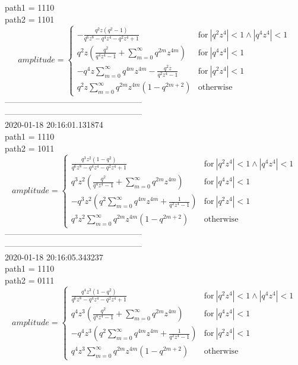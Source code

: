 path1 = 1110\\
path2 = 1101\\
$$amplitude = \begin{cases} - \frac{q^{2} z \left(q^{2} - 1\right)}{q^{6} z^{8} - q^{4} z^{4} - q^{2} z^{4} + 1} & \text{for}\: \left|{q^{2} z^{4}}\right| < 1 \wedge \left|{q^{4} z^{4}}\right| < 1 \\q^{2} z \left(\frac{q^{2}}{q^{4} z^{4} - 1} + \sum_{m=0}^{\infty} q^{2 m} z^{4 m}\right) & \text{for}\: \left|{q^{4} z^{4}}\right| < 1 \\- q^{4} z \sum_{m=0}^{\infty} q^{4 m} z^{4 m} - \frac{q^{2} z}{q^{2} z^{4} - 1} & \text{for}\: \left|{q^{2} z^{4}}\right| < 1 \\q^{2} z \sum_{m=0}^{\infty} q^{2 m} z^{4 m} \left(1 - q^{2 m + 2}\right) & \text{otherwise} \end{cases}$$
--------------------------------------------------\\
--------------------------------------------------\\
2020-01-18 20:16:01.131874\\
path1 = 1110\\
path2 = 1011\\
$$amplitude = \begin{cases} \frac{q^{3} z^{2} \left(1 - q^{2}\right)}{q^{6} z^{8} - q^{4} z^{4} - q^{2} z^{4} + 1} & \text{for}\: \left|{q^{2} z^{4}}\right| < 1 \wedge \left|{q^{4} z^{4}}\right| < 1 \\q^{3} z^{2} \left(\frac{q^{2}}{q^{4} z^{4} - 1} + \sum_{m=0}^{\infty} q^{2 m} z^{4 m}\right) & \text{for}\: \left|{q^{4} z^{4}}\right| < 1 \\- q^{3} z^{2} \left(q^{2} \sum_{m=0}^{\infty} q^{4 m} z^{4 m} + \frac{1}{q^{2} z^{4} - 1}\right) & \text{for}\: \left|{q^{2} z^{4}}\right| < 1 \\q^{3} z^{2} \sum_{m=0}^{\infty} q^{2 m} z^{4 m} \left(1 - q^{2 m + 2}\right) & \text{otherwise} \end{cases}$$
--------------------------------------------------\\
--------------------------------------------------\\
2020-01-18 20:16:05.343237\\
path1 = 1110\\
path2 = 0111\\
$$amplitude = \begin{cases} \frac{q^{4} z^{3} \left(1 - q^{2}\right)}{q^{6} z^{8} - q^{4} z^{4} - q^{2} z^{4} + 1} & \text{for}\: \left|{q^{2} z^{4}}\right| < 1 \wedge \left|{q^{4} z^{4}}\right| < 1 \\q^{4} z^{3} \left(\frac{q^{2}}{q^{4} z^{4} - 1} + \sum_{m=0}^{\infty} q^{2 m} z^{4 m}\right) & \text{for}\: \left|{q^{4} z^{4}}\right| < 1 \\- q^{4} z^{3} \left(q^{2} \sum_{m=0}^{\infty} q^{4 m} z^{4 m} + \frac{1}{q^{2} z^{4} - 1}\right) & \text{for}\: \left|{q^{2} z^{4}}\right| < 1 \\q^{4} z^{3} \sum_{m=0}^{\infty} q^{2 m} z^{4 m} \left(1 - q^{2 m + 2}\right) & \text{otherwise} \end{cases}$$
